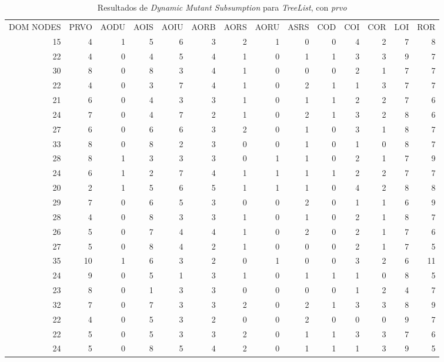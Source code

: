 \begin{table}[]
	\caption{Resultados de \emph{Dynamic Mutant Subsumption} para \emph{TreeList}, con \emph{prvo}}
	\label{tables.results.subsumption.treelist.prvo}
	\centering
	\scriptsize
	\def\arraystretch{0.95}
	\setlength\tabcolsep{0.5mm}
	\begin{tabular}{rrrrrrrrrrrrrr}
		DOM NODES & PRVO & AODU & AOIS & AOIU & AORB & AORS & AORU & ASRS & COD & COI & COR & LOI & ROR \\
		15 & 4 & 1 & 5 & 6 & 3 & 2 & 1 & 0 & 0 & 4 & 2 & 7 & 8 \\
		22 & 4 & 0 & 4 & 5 & 4 & 1 & 0 & 1 & 1 & 3 & 3 & 9 & 7 \\
		30 & 8 & 0 & 8 & 3 & 4 & 1 & 0 & 0 & 0 & 2 & 1 & 7 & 7 \\
		22 & 4 & 0 & 3 & 7 & 4 & 1 & 0 & 2 & 1 & 1 & 3 & 7 & 7 \\
		21 & 6 & 0 & 4 & 3 & 3 & 1 & 0 & 1 & 1 & 2 & 2 & 7 & 6 \\
		24 & 7 & 0 & 4 & 7 & 2 & 1 & 0 & 2 & 1 & 3 & 2 & 8 & 6 \\
		27 & 6 & 0 & 6 & 6 & 3 & 2 & 0 & 1 & 0 & 3 & 1 & 8 & 7 \\
		33 & 8 & 0 & 8 & 2 & 3 & 0 & 0 & 1 & 0 & 1 & 0 & 8 & 7 \\
		28 & 8 & 1 & 3 & 3 & 3 & 0 & 1 & 1 & 0 & 2 & 1 & 7 & 9 \\
		24 & 6 & 1 & 2 & 7 & 4 & 1 & 1 & 1 & 1 & 2 & 2 & 7 & 7 \\
		20 & 2 & 1 & 5 & 6 & 5 & 1 & 1 & 1 & 0 & 4 & 2 & 8 & 8 \\
		29 & 7 & 0 & 6 & 5 & 3 & 0 & 0 & 2 & 0 & 1 & 1 & 6 & 9 \\
		28 & 4 & 0 & 8 & 3 & 3 & 1 & 0 & 1 & 0 & 2 & 1 & 8 & 7 \\
		26 & 5 & 0 & 7 & 4 & 4 & 1 & 0 & 2 & 0 & 2 & 1 & 7 & 6 \\
		27 & 5 & 0 & 8 & 4 & 2 & 1 & 0 & 0 & 0 & 2 & 1 & 7 & 5 \\
		35 & 10 & 1 & 6 & 3 & 2 & 0 & 1 & 0 & 0 & 3 & 2 & 6 & 11 \\
		24 & 9 & 0 & 5 & 1 & 3 & 1 & 0 & 1 & 1 & 1 & 0 & 8 & 5 \\
		23 & 8 & 0 & 1 & 3 & 3 & 0 & 0 & 0 & 0 & 1 & 2 & 4 & 7 \\
		32 & 7 & 0 & 7 & 3 & 3 & 2 & 0 & 2 & 1 & 3 & 3 & 8 & 9 \\
		22 & 4 & 0 & 5 & 3 & 2 & 0 & 0 & 2 & 0 & 0 & 0 & 9 & 7 \\
		22 & 5 & 0 & 5 & 3 & 3 & 2 & 0 & 1 & 1 & 3 & 3 & 7 & 6 \\
		24 & 5 & 0 & 8 & 5 & 4 & 2 & 0 & 1 & 1 & 1 & 3 & 9 & 5 \\

\end{tabular}
\end{table}
